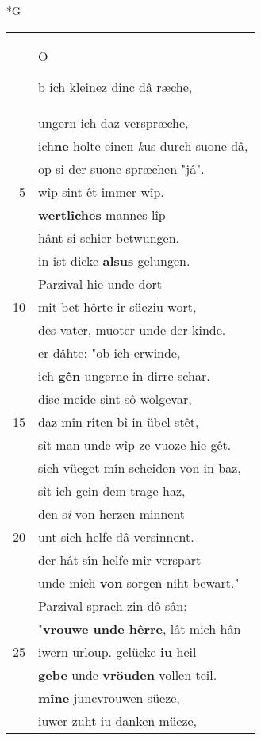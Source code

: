 \documentclass[8pt,a4paper,notitlepage]{article}
\begin{document}
\begin{table}[ht]
\begin{minipage}[t]{0.5\linewidth}
\small
\begin{center}*G
\end{center}
\begin{tabular}{rl}
 & \begin{large}O\end{large}b ich kleinez dinc dâ ræche,\\ 
 & ungern ich daz verspræche,\\ 
 & ich\textbf{ne} holte einen \textit{k}us durch suone dâ,\\ 
 & op si der suone spræchen "jâ".\\ 
5 & wîp sint êt immer wîp.\\ 
 & \textbf{wertlîches} mannes lîp\\ 
 & hânt si schier betwungen.\\ 
 & in ist dicke \textbf{alsus} gelungen.\\ 
 & Parzival hie unde dort\\ 
10 & mit bet hôrte ir süeziu wort,\\ 
 & des vater, muoter unde der kinde.\\ 
 & er dâhte: "ob ich erwinde,\\ 
 & ich \textbf{gên} ungerne in dirre schar.\\ 
 & dise meide sint sô wolgevar,\\ 
15 & daz mîn rîten bî in übel stêt,\\ 
 & sît man unde wîp ze vuoze hie gêt.\\ 
 & sich vüeget mîn scheiden von in baz,\\ 
 & sît ich gein dem trage haz,\\ 
 & den s\textit{i} von herzen minnent\\ 
20 & unt sich helfe dâ versinnent.\\ 
 & der hât sîn helfe mir verspart\\ 
 & unde mich \textbf{von} sorgen niht bewart."\\ 
 & Parzival sprach zin dô sân:\\ 
 & "\textbf{vrouwe unde hêrre}, lât mich hân\\ 
25 & iwern urloup. gelücke \textbf{iu} heil\\ 
 & \textbf{gebe} unde \textbf{vröuden} vollen teil.\\ 
 & \textbf{mîne} juncvrouwen süeze,\\ 
 & iuwer zuht iu danken müeze,\\ 

\end{tabular}
\end{minipage}
\end{table}
\end{document}

